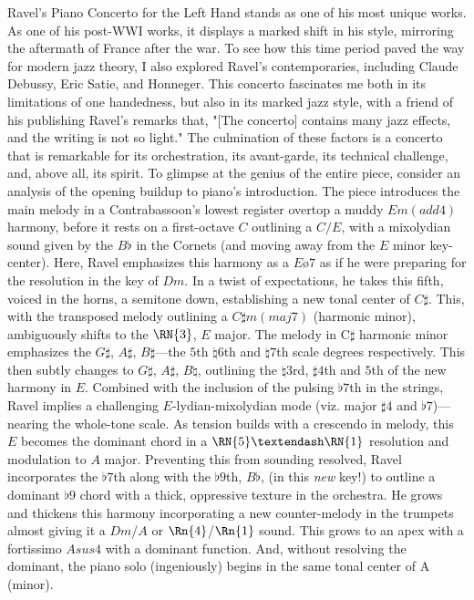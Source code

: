 \documentclass[12pt]{article}
\begin{document}
Ravel’s Piano Concerto for the Left Hand stands as one of his most unique works. As one of his post-WWI works, it displays a marked shift in his style, mirroring the aftermath of France after the war.\autocite[100]{Orenstein} 
To see how this time period paved the way for modern jazz theory, I also explored Ravel's contemporaries, including Claude Debussy, Eric Satie, and Honneger. 
This concerto fascinates me both in its limitations of one handedness, but also in its marked jazz style, with a friend of his publishing Ravel's remarks that, "[The concerto] contains many jazz effects, and the writing is not so light."\autocite{1933} The culmination of these factors is a concerto that is remarkable for its orchestration, its avant-garde, its technical challenge, and, above all, its spirit.
 To glimpse at the genius of the entire piece, consider an analysis of the opening buildup to piano's introduction. The piece introduces the main melody in a Contrabassoon's lowest register overtop a muddy $Em(add 4)$ harmony, before it rests on a first-octave $C$ outlining a $C/E$, with a mixolydian sound given by the $B\flat$ in the Cornets (and moving away from the $E$ minor key-center). Here, Ravel emphasizes this harmony as a $Eø7$ as if he were preparing for the resolution in the key of $Dm$. In a twist of expectations, he takes this fifth, voiced in the horns, a semitone down, establishing a new tonal center of $C\sharp$. This, with the transposed melody outlining a $C\sharp m(maj 7)$ (harmonic minor), ambiguously shifts to the $\RN{3}$, $E$ major. The melody in C$\sharp$ harmonic minor emphasizes the $G\sharp$, $A\sharp$, $B\sharp$—the $5$th $\natural6$th and $\natural7$th scale degrees respectively. This then subtly changes to $G\sharp$, $A\sharp$, $B\natural$, outlining the $\natural3$rd, $\sharp4$th and $5$th of the new harmony in $E$. Combined with the inclusion of the pulsing $\flat 7$th in the strings, Ravel implies a challenging $E$-lydian-mixolydian mode (viz. major $\sharp 4$ and $\flat 7$)—nearing the whole-tone scale. As tension builds with a crescendo in melody, this $E$ becomes the dominant chord in a $\RN{5}–\RN{1}$ resolution and modulation to $A$ major. Preventing this from sounding resolved, Ravel incorporates the $\flat 7$th along with the $\flat 9$th, $B\flat$, (in this \textit{new} key!) to outline a dominant $\flat 9$ chord with a thick, oppressive texture in the orchestra. He grows and thickens this harmony incorporating a new counter-melody in the trumpets almost giving it a $Dm$/$A$ or $\Rn{4}$/$\Rn{1}$ sound. This grows to an apex with a fortissimo $Asus4$ with a dominant function. And, without resolving the dominant, the piano solo (ingeniously) begins in the same tonal center of A (minor).\autocite{ravel}
\end{document}

